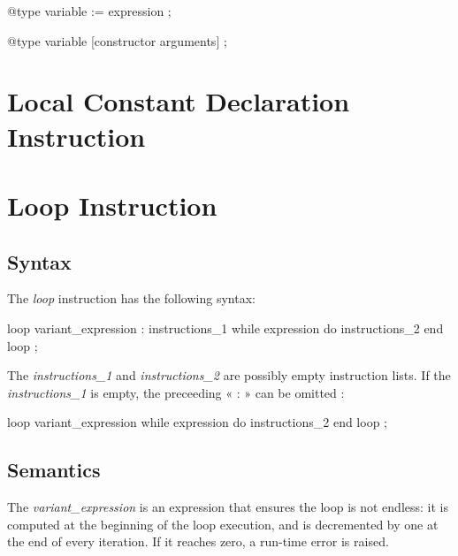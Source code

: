 {
\begin{galgascode}
@type variable := expression ;
\end{galgascode}
}

{
\begin{galgascode}
@type variable [constructor arguments] ;
\end{galgascode}
}


\section{Local Constant Declaration Instruction}








\section{Loop Instruction}


\subsection{Syntax}

The \emph{loop} instruction has the following syntax:
{
\begin{galgascode}
loop variant_expression
: instructions_1
while expression do
  instructions_2
end loop ;  
\end{galgascode}
}

The \emph{instructions\_1} and \emph{instructions\_2} are possibly empty instruction lists. If the \emph{instructions\_1} is empty, the preceeding « : » can be omitted :
{
\begin{galgascode}
loop variant_expression
while expression do
  instructions_2
end loop ;  
\end{galgascode}
}

\subsection{Semantics}

The \emph{variant\_expression} is an  expression that ensures the loop is not endless: it is computed at the beginning of the loop execution, and is decremented by one at the end of every iteration. If it reaches zero, a run-time error is raised.

